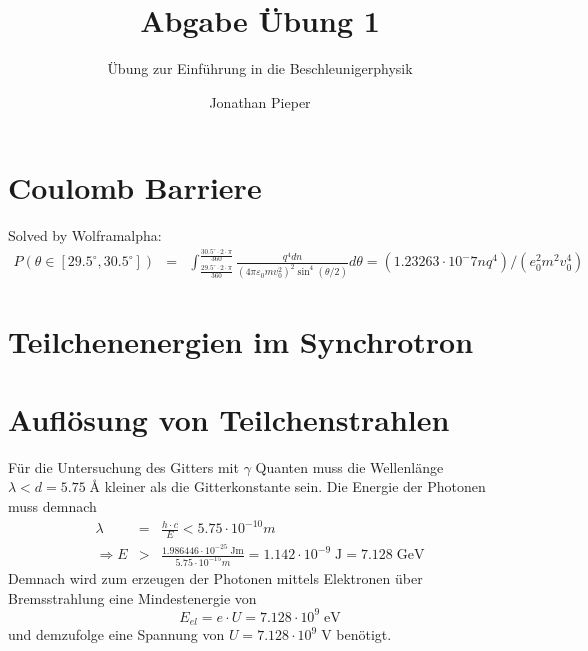 \documentclass[12pt,DIV=15,a4paper,twoside,draft=false]{scrartcl}
\author{Jonathan Pieper}
\title{Abgabe Übung 1}
\subtitle{Übung zur Einführung in die Beschleunigerphysik}
\begin{document}
\maketitle
{}

\section{Coulomb Barriere}
Solved by Wolframalpha:
\begin{eqnarray*}
P(θ∈[29.5^\circ , 30.5^{\circ}]) &=& ∫_{\frac{29.5^\circ \cdot 2 \cdot \pi}{360}}^{\frac{30.5^{\circ} \cdot 2 \cdot \pi}{360}}
\frac{q^4 d n}{(4 \pi ε_0 m v_0^2)^2 \sin^4(θ/2)} dθ = (1.23263\cdot 10^-7 n q^4)/(e_0^2 m^2 v_0^4)
\end{eqnarray*}

\section{Teilchenenergien im Synchrotron}

\section{Auflösung von Teilchenstrahlen}
Für die Untersuchung des Gitters mit $γ$ Quanten muss die Wellenlänge $λ < d = 5.75\;{}$\AA{} kleiner als die Gitterkonstante sein.
Die Energie der Photonen muss demnach
\begin{eqnarray*}
λ & = & \frac{h\cdot c}{E} < 5.75\cdot 10^{-10} m \\
\Rightarrow E  & > & \frac{1.986446\cdot 10^{-25}\;\mathrm{J m}}{5.75\cdot 10^{-15} m} = 1.142\cdot 10^{-9}\;\mathrm{J} = 7.128\;\mathrm{GeV}
\end{eqnarray*}
Demnach wird zum erzeugen der Photonen mittels Elektronen über Bremsstrahlung eine Mindestenergie von
$$ E_{el} = e\cdot U = 7.128\cdot 10^9\;\mathrm{eV}$$
und demzufolge eine Spannung von $U = 7.128\cdot 10^9\;\mathrm{V}$ benötigt.
\end{document}
